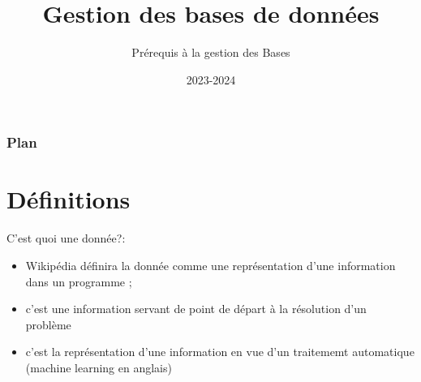 \documentclass{beamer}
\title[Short title]{Gestion des bases de donn\'ees} %
\author{Pr\'erequis \`a la gestion des Bases} %
\institute[Sorbonne] %
{
Panth\'eon Sorbonne\\ %
\medskip
}
\date{2023-2024} %
\begin{document}
\begin{frame}
\titlepage %
\end{frame}

\begin{frame}
\frametitle{Plan} %
\tableofcontents %
\end{frame}



\section{D\'efinitions}
\begin{frame}{C'est quoi une donn\'ee?:}
    \begin{itemize}
        \item Wikip\'edia d\'efinira la donn\'ee comme une repr\'esentation d'une information dans un programme  ;
        \item c'est une information servant de point de d\'epart \`a la r\'esolution d'un probl\`eme
        \item c'est la repr\'esentation d'une information en vue d'un traitememt automatique (machine learning en anglais)
    \end{itemize}
\end{frame}
\end{document}
